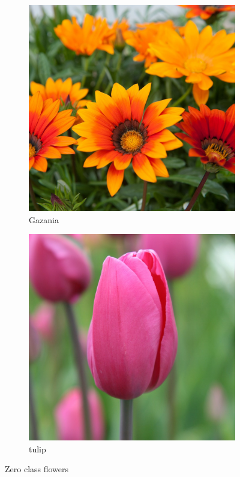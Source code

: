 \documentclass[11]{article}
\begin{document}
\begin{figure}[H]
    \begin{subfigure}[t]{0.45\textwidth}
    \centering
  \includegraphics[scale=0.20]{images/gazania.jpg}
    \caption{Gazania}
    \label{gazania}
    \end{subfigure}
    \begin{subfigure}[t]{0.45\textwidth}
    \centering
    \includegraphics[scale=0.20]{images/tulip.jpg}
    \caption{tulip}
    \label{tulip}
    \end{subfigure}
    \label{zero}
    \caption{Zero class flowers}
\end{figure}
\end{document}

